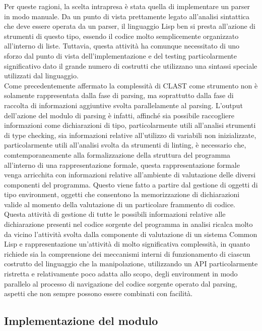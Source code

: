 Per queste ragioni, la scelta intrapresa è stata quella di implementare un
parser in modo manuale. Da un punto di vista prettamente legato all’analisi
sintattica che deve essere operata da un parser, il linguaggio Lisp ben si
presta all’azione di strumenti di questo tipo, essendo il codice molto
semplicemente organizzato all’interno di liste. Tuttavia, questa attività ha
comunque necessitato di uno sforzo dal punto di vista dell’implementazione e
del testing particolarmente significativo dato il grande numero di costrutti
che utilizzano una sintassi speciale utilizzati dal linguaggio.\\

Come precedentemente affermato la complessità di CLAST come strumento non è
solamente rappresentata dalla fase di parsing, ma soprattutto dalla fase di
raccolta di informazioni aggiuntive svolta parallelamente al parsing. L’output
dell’azione del modulo di parsing è infatti, affinché sia possibile
raccogliere informazioni come dichiarazioni di tipo, particolarmente utili
all'analisi strumenti di type checking, sia informazioni relative all’utilizzo
di variabili non inizializzate, particolarmente utili all’analisi svolta da
strumenti di linting, è necessario che, comtemporaneamente alla
formalizzazione della struttura del programma all’interno di una
rappresentazione formale, questa rappresentazione formale venga arricchita con
informazioni relative all’ambiente di valutazione delle diversi componenti del
programma. Questo viene fatto a partire dal gestione di oggetti di tipo
environment, oggetti che consentono la memorizzazione di dichiarazioni valide
al momento della valutazione di un particolare frammento di codice. Questa
attività di gestione di tutte le possibili informazioni relative alle
dichiarazione presenti nel codice sorgente del programma in analisi ricalca
molto da vicino l’attività svolta dalla componente di valutazione di un
sistema Common Lisp e rappresentazione un’attività di molto significativa
complessità, in quanto richiede sia la comprensione dei meccanismi interni di
funzionamento di ciascun costrutto del linguaggio che la manipolazione,
utilizzando un API particolarmente ristretta e relativamente poco adatta allo
scopo, degli environment in modo parallelo al processo di navigazione del
codice sorgente operato dal parsing, aspetti che non sempre possono essere
combinati con facilità.

\subsection{Implementazione del modulo}

